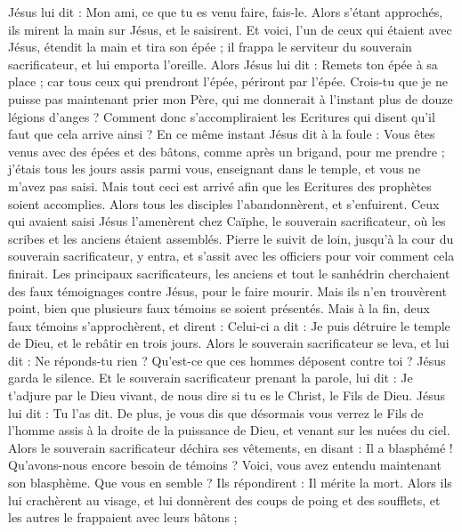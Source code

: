\begin{multicols}{2}
Jésus lui dit : Mon ami, ce que tu es venu faire, fais-le. Alors s'étant approchés, ils mirent la main sur Jésus, et le saisirent.
Et voici, l'un de ceux qui étaient avec Jésus, étendit la main et tira son épée ; il frappa le serviteur du souverain sacrificateur, et lui emporta l'oreille.
Alors Jésus lui dit : Remets ton épée à sa place ; car tous ceux qui prendront l'épée, périront par l'épée.
Crois-tu que je ne puisse pas maintenant prier mon Père, qui me donnerait à l’instant plus de douze légions d'anges ?
Comment donc s’accompliraient les Ecritures qui disent qu'il faut que cela arrive ainsi ?
En ce même instant Jésus dit à la foule : Vous êtes venus avec des épées et des bâtons, comme après un brigand, pour me prendre ; j'étais tous les jours assis parmi vous, enseignant dans le temple, et vous ne m'avez pas saisi.
Mais tout ceci est arrivé afin que les Ecritures des prophètes soient accomplies. Alors tous les disciples l'abandonnèrent, et s'enfuirent.
Ceux qui avaient saisi Jésus l'amenèrent chez Caïphe, le souverain sacrificateur, où les scribes et les anciens étaient assemblés.
Pierre le suivit de loin, jusqu’à la cour du souverain sacrificateur, y entra, et s’assit avec les officiers pour voir comment cela finirait.
Les principaux sacrificateurs, les anciens et tout le sanhédrin cherchaient des faux témoignages contre Jésus, pour le faire mourir.
Mais ils n'en trouvèrent point, bien que plusieurs faux témoins se soient présentés. Mais à la fin, deux faux témoins s'approchèrent,
et dirent : Celui-ci a dit : Je puis détruire le temple de Dieu, et le rebâtir en trois jours.
Alors le souverain sacrificateur se leva, et lui dit : Ne réponds-tu rien ? Qu’est-ce que ces hommes déposent contre toi ?
Jésus garda le silence. Et le souverain sacrificateur prenant la parole, lui dit : Je t’adjure par le Dieu vivant, de nous dire si tu es le Christ, le Fils de Dieu.
Jésus lui dit : Tu l'as dit. De plus, je vous dis que désormais vous verrez le Fils de l'homme assis à la droite de la puissance de Dieu, et venant sur les nuées du ciel.
Alors le souverain sacrificateur déchira ses vêtements, en disant : Il a blasphémé ! Qu’avons-nous encore besoin de témoins ? Voici, vous avez entendu maintenant son blasphème. Que vous en semble ?
Ils répondirent : Il mérite la mort.
Alors ils lui crachèrent au visage, et lui donnèrent des coups de poing et des soufflets, et les autres le frappaient avec leurs bâtons ;

\end{multicols}
